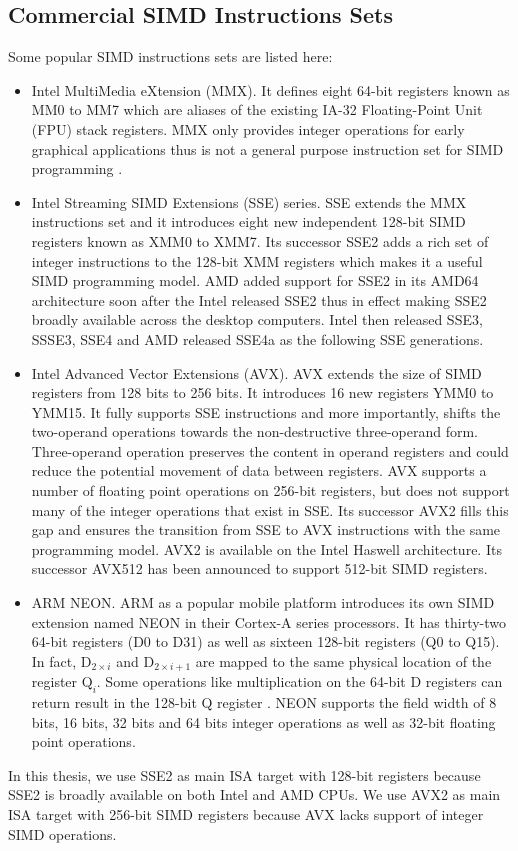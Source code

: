 \subsection{Commercial SIMD Instructions Sets}
Some popular SIMD instructions sets are listed here:
\begin{itemize}
  \item Intel MultiMedia eXtension (MMX). It defines eight 64-bit registers known as MM0 to MM7 which are aliases of the existing IA-32 Floating-Point Unit (FPU) stack registers. MMX only provides integer operations for early graphical applications thus is not a general purpose instruction set for SIMD programming \cite{hua_idisa}.

  \item Intel Streaming SIMD Extensions (SSE) series. SSE extends the MMX instructions set and it introduces eight new independent 128-bit SIMD registers known as XMM0 to XMM7. Its successor SSE2 adds a rich set of integer instructions to the 128-bit XMM registers which makes it a useful SIMD programming model. AMD added support for SSE2 in its AMD64 architecture soon after the Intel released SSE2 thus in effect making SSE2 broadly available across the desktop computers. Intel then released SSE3, SSSE3, SSE4 and AMD released SSE4a as the following SSE generations.

  \item Intel Advanced Vector Extensions (AVX). AVX extends the size of SIMD registers from 128 bits to 256 bits. It introduces 16 new registers YMM0 to YMM15. It fully supports SSE instructions and more importantly, shifts the two-operand operations towards the non-destructive three-operand form. Three-operand operation preserves the content in operand registers and could reduce the potential movement of data between registers. AVX supports a number of floating point operations on 256-bit registers, but does not support many of the integer operations that exist in SSE\@. Its successor AVX2 fills this gap and ensures the transition from SSE to AVX instructions with the same programming model. AVX2 is available on the Intel Haswell architecture. Its successor AVX512 has been announced to support 512-bit SIMD registers.

  \item ARM NEON\@. ARM as a popular mobile platform introduces its own SIMD extension named NEON in their Cortex-A series processors. It has thirty-two 64-bit registers (D0 to D31) as well as sixteen 128-bit registers (Q0 to Q15). In fact, $\text{D}_{2 \times i}$ and $\text{D}_{2 \times i + 1}$ are mapped to the same physical location of the register $\text{Q}_i$. Some operations like multiplication on the 64-bit D registers can return result in the 128-bit Q register \cite{hua_idisa}. NEON supports the field width of 8 bits, 16 bits, 32 bits and 64 bits integer operations as well as 32-bit floating point operations.
\end{itemize}
In this thesis, we use SSE2 as main ISA target with 128-bit registers because SSE2 is broadly available on both Intel and AMD CPUs. We use AVX2 as main ISA target with 256-bit SIMD registers because AVX lacks support of integer SIMD operations.


